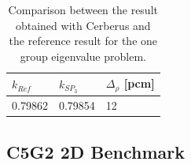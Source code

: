 \documentclass{anstrans}
\begin{document}


\begin{table}[htbp!]
	\centering
	\caption{Comparison between the result obtained with Cerberus and the reference result for the one group eigenvalue problem.}
	\label{tab:keff-1st}
	\begin{tabular}{lll}
	\toprule
		$k_{Ref}$	& $k_{SP_3}$ 	& $\Delta_{\rho}$ [pcm]	\\
	\midrule
	 	0.79862		& 0.79854		& 12				\\
	\bottomrule
	\end{tabular}
\end{table}


\subsection{C5G2 2D Benchmark}
\end{document}
